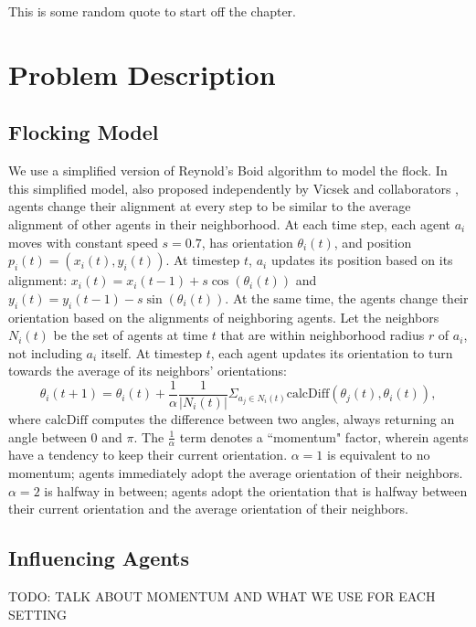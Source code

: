 \begin{savequote}[75mm]
This is some random quote to start off the chapter.
\end{savequote}

\chapter{Problem Description}
\label{ch:problem}

\section{Flocking Model}
We use a simplified version of Reynold's Boid algorithm \cite{reynoldsmodel}
to model the flock.
In this simplified model, also proposed independently by Vicsek and
collaborators \cite{vicsek1995},
agents change their alignment at every step to be similar to the average
alignment of other agents in their neighborhood.
At each time step, each agent $a_i$ moves with constant speed $s=0.7$, has
orientation $\theta_i(t)$, and position $p_i(t) = (x_i(t), y_i(t))$.
At timestep $t$, $a_i$ updates its position based on its alignment:
$x_i(t) = x_i(t-1) + s\cos(\theta_i(t))$ and
$y_i(t) = y_i (t-1) - s\sin(\theta_i(t))$.
At the same time, the agents change their orientation based on the alignments
of neighboring agents.
Let the neighbors $N_i(t)$ be the set of agents at time $t$ that are within
neighborhood radius $r$ of $a_i$, not including $a_i$ itself.
At timestep $t$, each agent updates its orientation to turn towards the average
of its neighbors' orientations:
\[\theta_i(t+1)=\theta_i(t)+\frac{1}{\alpha}\frac{1}{|N_i(t)|} \Sigma_{a_j \in
N_i(t)} \text{calcDiff}(\theta_j(t),\theta_i(t)),\]
where $\text{calcDiff}$ computes the difference between two angles, always
returning an angle between $0$ and $\pi$.
The $\frac{1}{\alpha}$ term denotes a ``momentum" factor, wherein agents have
a tendency to keep their current orientation.
$\alpha=1$ is equivalent to no momentum; agents immediately adopt the average
orientation of their neighbors.
$\alpha=2$ is halfway in between; agents adopt the orientation that is halfway
between their current orientation and the average orientation of their
neighbors.

\section{Influencing Agents}
TODO: TALK ABOUT MOMENTUM AND WHAT WE USE FOR EACH SETTING

